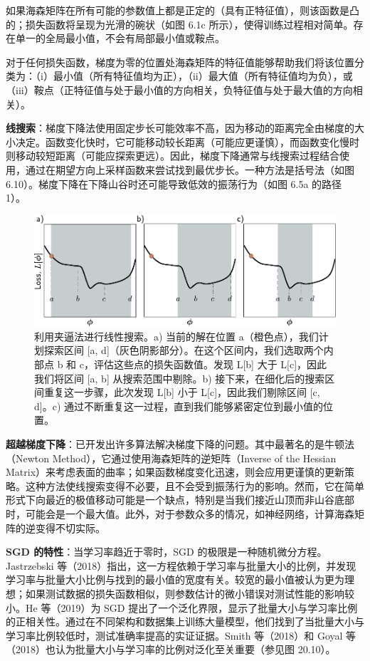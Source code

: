 \documentclass[lang=cn,newtx,10pt,scheme=chinese]{elegantbook}
\begin{document}
如果海森矩阵在所有可能的参数值上都是正定的（具有正特征值），则该函数是凸的；损失函数将呈现为光滑的碗状（如图 6.1c 所示），使得训练过程相对简单。存在单一的全局最小值，不会有局部最小值或鞍点。

对于任何损失函数，梯度为零的位置处海森矩阵的特征值能够帮助我们将该位置分类为：（i）最小值（所有特征值均为正），（ii）最大值（所有特征值均为负），或（iii）鞍点（正特征值与处于最小值的方向相关，负特征值与处于最大值的方向相关）。

\textbf{线搜索}：梯度下降法使用固定步长可能效率不高，因为移动的距离完全由梯度的大小决定。函数变化快时，它可能移动较长距离（可能应更谨慎），而函数变化慢时则移动较短距离（可能应探索更远）。因此，梯度下降通常与线搜索过程结合使用，通过在期望方向上采样函数来尝试找到最优步长。一种方法是括号法（如图 6.10）。梯度下降在下降山谷时还可能导致低效的振荡行为（如图 6.5a 的路径 1）。

\begin{figure}[ht!]
\centering
\includegraphics[width=0.7\linewidth]{PDFFigures/UDLChap6PDF/TrainLineSearch.pdf}
\caption{利用夹逼法进行线性搜索。a) 当前的解在位置 a（橙色点），我们计划探索区间 [a, d]（灰色阴影部分）。在这个区间内，我们选取两个内部点 b 和 c，评估这些点的损失函数值。发现 L[b] 大于 L[c]，因此我们将区间 [a, b] 从搜索范围中剔除。b) 接下来，在细化后的搜索区间重复这一步骤，此次发现 L[b] 小于 L[c]，因此我们剔除区间 [c, d]。c) 通过不断重复这一过程，直到我们能够紧密定位到最小值的位置。}
\end{figure}

\textbf{超越梯度下降}：已开发出许多算法解决梯度下降的问题。其中最著名的是牛顿法（Newton Method），它通过使用海森矩阵的逆矩阵（Inverse of the Hessian Matrix）来考虑表面的曲率；如果函数梯度变化迅速，则会应用更谨慎的更新策略。这种方法使线搜索变得不必要，且不会受到振荡行为的影响。然而，它在简单形式下向最近的极值移动可能是一个缺点，特别是当我们接近山顶而非山谷底部时，可能会是一个最大值。此外，对于参数众多的情况，如神经网络，计算海森矩阵的逆变得不切实际。

\textbf{SGD 的特性}：当学习率趋近于零时，SGD 的极限是一种随机微分方程。Jastrzebski 等（2018）指出，这一方程依赖于学习率与批量大小的比例，并发现学习率与批量大小比例与找到的最小值的宽度有关。较宽的最小值被认为更为理想；如果测试数据的损失函数相似，则参数估计的微小错误对测试性能的影响较小。He 等（2019）为 SGD 提出了一个泛化界限，显示了批量大小与学习率比例的正相关性。通过在不同架构和数据集上训练大量模型，他们找到了当批量大小与学习率比例较低时，测试准确率提高的实证证据。Smith 等（2018）和 Goyal 等（2018）也认为批量大小与学习率的比例对泛化至关重要（参见图 20.10）。
\end{document}
